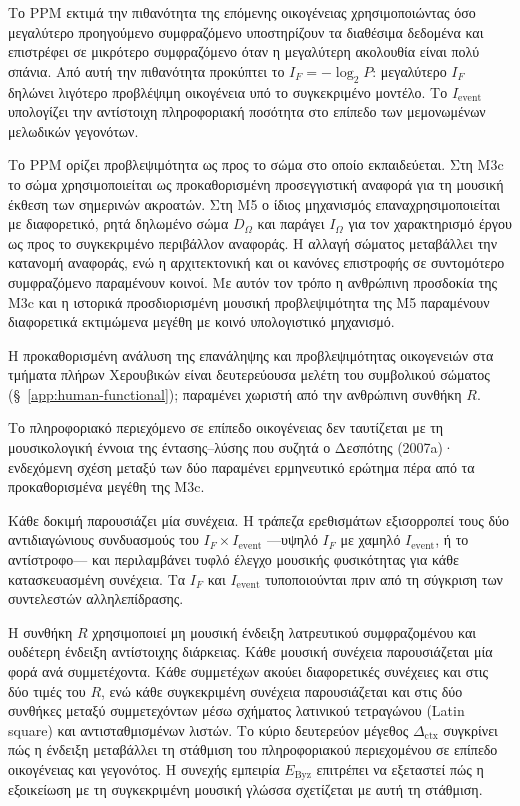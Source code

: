 \documentclass[11pt,a4paper]{article}
\begin{document}
Το PPM εκτιμά την πιθανότητα της επόμενης οικογένειας χρησιμοποιώντας όσο μεγαλύτερο προηγούμενο συμφραζόμενο υποστηρίζουν τα διαθέσιμα δεδομένα και επιστρέφει σε μικρότερο συμφραζόμενο όταν η μεγαλύτερη ακολουθία είναι πολύ σπάνια. Από αυτή την πιθανότητα προκύπτει το $I_F=-\log_2P$: μεγαλύτερο $I_F$ δηλώνει λιγότερο προβλέψιμη οικογένεια υπό το συγκεκριμένο μοντέλο. Το $I_{\mathrm{event}}$ υπολογίζει την αντίστοιχη πληροφοριακή ποσότητα στο επίπεδο των μεμονωμένων μελωδικών γεγονότων.

Το PPM ορίζει προβλεψιμότητα ως προς το σώμα στο οποίο εκπαιδεύεται. Στη M3c το σώμα χρησιμοποιείται ως προκαθορισμένη προσεγγιστική αναφορά για τη μουσική έκθεση των σημερινών ακροατών. Στη M5 ο ίδιος μηχανισμός επαναχρησιμοποιείται με διαφορετικό, ρητά δηλωμένο σώμα $D_{\Omega}$ και παράγει $I_{\Omega}$ για τον χαρακτηρισμό έργου ως προς το συγκεκριμένο περιβάλλον αναφοράς. Η αλλαγή σώματος μεταβάλλει την κατανομή αναφοράς, ενώ η αρχιτεκτονική και οι κανόνες επιστροφής σε συντομότερο συμφραζόμενο παραμένουν κοινοί. Με αυτόν τον τρόπο η ανθρώπινη προσδοκία της M3c και η ιστορικά προσδιορισμένη μουσική προβλεψιμότητα της M5 παραμένουν διαφορετικά εκτιμώμενα μεγέθη με κοινό υπολογιστικό μηχανισμό.

Η προκαθορισμένη ανάλυση της επανάληψης και προβλεψιμότητας οικογενειών στα τμήματα πλήρων Χερουβικών είναι δευτερεύουσα μελέτη του συμβολικού σώματος (§~\ref{app:human-functional}); παραμένει χωριστή από την ανθρώπινη συνθήκη $R$.


Το πληροφοριακό περιεχόμενο σε επίπεδο οικογένειας δεν ταυτίζεται με τη μουσικολογική έννοια της έντασης--λύσης που συζητά ο Δεσπότης (2007a)· ενδεχόμενη σχέση μεταξύ των δύο παραμένει ερμηνευτικό ερώτημα πέρα από τα προκαθορισμένα μεγέθη της M3c.

Κάθε δοκιμή παρουσιάζει μία συνέχεια. Η τράπεζα ερεθισμάτων εξισορροπεί τους δύο αντιδιαγώνιους συνδυασμούς του $I_F\times I_{\mathrm{event}}$ ---υψηλό $I_F$ με χαμηλό $I_{\mathrm{event}}$, ή το αντίστροφο--- και περιλαμβάνει τυφλό έλεγχο μουσικής φυσικότητας για κάθε κατασκευασμένη συνέχεια. Τα $I_F$ και $I_{\mathrm{event}}$ τυποποιούνται πριν από τη σύγκριση των συντελεστών αλληλεπίδρασης.

Η συνθήκη $R$ χρησιμοποιεί μη μουσική ένδειξη λατρευτικού συμφραζομένου και ουδέτερη ένδειξη αντίστοιχης διάρκειας. Κάθε μουσική συνέχεια παρουσιάζεται μία φορά ανά συμμετέχοντα. Κάθε συμμετέχων ακούει διαφορετικές συνέχειες και στις δύο τιμές του $R$, ενώ κάθε συγκεκριμένη συνέχεια παρουσιάζεται και στις δύο συνθήκες μεταξύ συμμετεχόντων μέσω σχήματος λατινικού τετραγώνου (Latin square) και αντισταθμισμένων λιστών. Το κύριο δευτερεύον μέγεθος $\Delta_{\mathrm{ctx}}$ συγκρίνει πώς η ένδειξη μεταβάλλει τη στάθμιση του πληροφοριακού περιεχομένου σε επίπεδο οικογένειας και γεγονότος. Η συνεχής εμπειρία $E_{\mathrm{Byz}}$ επιτρέπει να εξεταστεί πώς η εξοικείωση με τη συγκεκριμένη μουσική γλώσσα σχετίζεται με αυτή τη στάθμιση.
\end{document}
